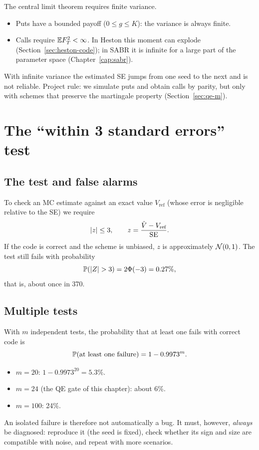 \begin{attenzione}[title={Finite variance: why we simulate puts}]
The central limit theorem requires finite variance.
\begin{itemize}
\item Puts have a bounded payoff ($0\le g\le K$): the variance is always finite.
\item Calls require $\mathbb{E} F_T^2<\infty$. In Heston this moment can explode (Section~\ref{sec:heston-code}); in SABR it
is infinite for a large part of the parameter space (Chapter~\ref{cap:sabr}).
\end{itemize}
With infinite variance the estimated SE jumps from one seed to the next and is not reliable. Project rule: we
simulate puts and obtain calls by parity, but only with schemes that preserve the martingale property
(Section~\ref{sec:qe-m}).
\end{attenzione}

\section{The ``within 3 standard errors'' test}
\subsection{The test and false alarms}
To check an MC estimate against an exact value $V_{\text{ref}}$ (whose error is negligible relative to the SE) we
require
\begin{equation}\label{eq:test-3se}
|z|\le3,\qquad z=\frac{\hat V-V_{\text{ref}}}{\mathrm{SE}}.
\end{equation}
If the code is correct and the scheme is unbiased, $z$ is approximately $\mathcal{N}(0,1)$. The test still fails with
probability
\[
\PP(|Z|>3)=2\Phi(-3)=0.27\%,
\]
that is, about once in 370.

\subsection{Multiple tests}
With $m$ independent tests, the probability that at least one fails with correct code is
\begin{equation}\label{eq:test-multipli}
\mathbb{P}(\text{at least one failure})=1-0.9973^m .
\end{equation}

\begin{esempio}[title={Example: how often a correct gate fails}]
\begin{itemize}
\item $m=20$: $1-0.9973^{20}=5.3\%$.
\item $m=24$ (the QE gate of this chapter): about 6\%.
\item $m=100$: 24\%.
\end{itemize}
An isolated failure is therefore not automatically a bug. It must, however, \emph{always} be diagnosed: reproduce it
(the seed is fixed), check whether its sign and size are compatible with noise, and repeat with more scenarios.
\end{esempio}

